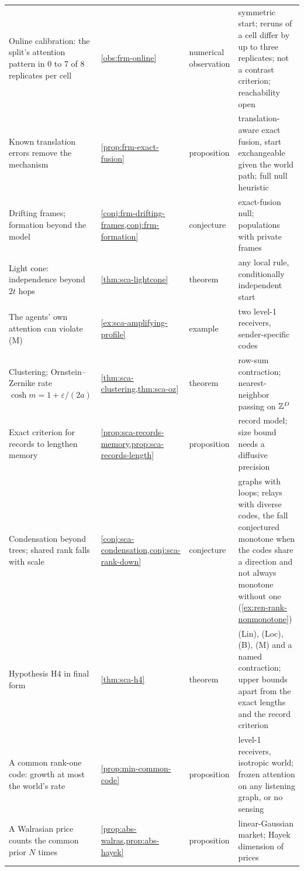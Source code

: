 \begin{longtable}{@{}>{\raggedright\arraybackslash}p{}>{\raggedright\arraybackslash}p{}>{\raggedright\arraybackslash}p{}>{\raggedright\arraybackslash}p{}@{}}
Online calibration: the split's attention pattern in 0 to 7 of 8 replicates per cell & \cref{obs:frm-online} & numerical observation & symmetric start; reruns of a cell differ by up to three replicates; not a contrast criterion; reachability open\\
Known translation errors remove the mechanism & \cref{prop:frm-exact-fusion} & proposition & translation-aware exact fusion, start exchangeable given the world path; full null heuristic\\
Drifting frames; formation beyond the model & \cref{conj:frm-drifting-frames,conj:frm-formation} & conjecture & exact-fusion null; populations with private frames\\
\addlinespace[2pt]
Light cone: independence beyond $2t$ hops & \cref{thm:sca-lightcone} & theorem & any local rule, conditionally independent start\\
The agents' own attention can violate (M) & \cref{ex:sca-amplifying-profile} & example & two level-1 receivers, sender-specific codes\\
Clustering; Ornstein--Zernike rate $\cosh m=1+\varepsilon/(2a)$ & \cref{thm:sca-clustering,thm:sca-oz} & theorem & row-sum contraction; nearest-neighbor passing on $\mathbb{Z}^D$\\
Exact criterion for records to lengthen memory & \cref{prop:sca-records-memory,prop:sca-records-length} & proposition & record model; size bound needs a diffusive precision\\
Condensation beyond trees; shared rank falls with scale & \cref{conj:sca-condensation,conj:sca-rank-down} & conjecture & graphs with loops; relays with diverse codes, the fall conjectured monotone when the codes share a direction and not always monotone without one (\cref{ex:ren-rank-nonmonotone})\\
Hypothesis H4 in final form & \cref{thm:sca-h4} & theorem & (Lin), (Loc), (B), (M) and a named contraction; upper bounds apart from the exact lengths and the record criterion\\
\addlinespace[2pt]
A common rank-one code: growth at most the world's rate & \cref{prop:min-common-code} & proposition & level-1 receivers, isotropic world; frozen attention on any listening graph, or no sensing\\
A Walrasian price counts the common prior $N$ times & \cref{prop:abs-walras,prop:abs-hayek} & proposition & linear-Gaussian market; Hayek dimension of prices\\
\end{longtable}
\endgroup

